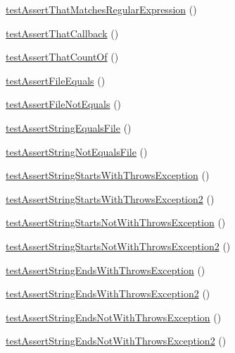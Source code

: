 \begin{DoxyCompactItemize}
\item 
\mbox{\hyperlink{class_framework___assert_test_a01bfe93225d3f6b19283003945d392cb}{test\+Assert\+That\+Matches\+Regular\+Expression}} ()
\item 
\mbox{\hyperlink{class_framework___assert_test_a59b8d4a483438cd5c0f2b934d640b530}{test\+Assert\+That\+Callback}} ()
\item 
\mbox{\hyperlink{class_framework___assert_test_a8d009baa93005665b92f4fd03152a23a}{test\+Assert\+That\+Count\+Of}} ()
\item 
\mbox{\hyperlink{class_framework___assert_test_a805b592ecc9a2a6d4a3c3e8d7f2b5363}{test\+Assert\+File\+Equals}} ()
\item 
\mbox{\hyperlink{class_framework___assert_test_a46c66ce31618ed83854ac6fd422e93b1}{test\+Assert\+File\+Not\+Equals}} ()
\item 
\mbox{\hyperlink{class_framework___assert_test_aef4e83a5c5185f7b393991313701fcdd}{test\+Assert\+String\+Equals\+File}} ()
\item 
\mbox{\hyperlink{class_framework___assert_test_aa0ed9a8d599f5fa816b91739e9042bd3}{test\+Assert\+String\+Not\+Equals\+File}} ()
\item 
\mbox{\hyperlink{class_framework___assert_test_a5d2c5c3fbfc70b632d0f9686faeac62c}{test\+Assert\+String\+Starts\+With\+Throws\+Exception}} ()
\item 
\mbox{\hyperlink{class_framework___assert_test_a9693c72d83f2fb329f25501671c39812}{test\+Assert\+String\+Starts\+With\+Throws\+Exception2}} ()
\item 
\mbox{\hyperlink{class_framework___assert_test_a5a42892c98fe0387684c679aa9388abd}{test\+Assert\+String\+Starts\+Not\+With\+Throws\+Exception}} ()
\item 
\mbox{\hyperlink{class_framework___assert_test_a2dbf2aad69f83d7d68fa586815d64f06}{test\+Assert\+String\+Starts\+Not\+With\+Throws\+Exception2}} ()
\item 
\mbox{\hyperlink{class_framework___assert_test_a169b3128b7d08892e289fc42e44cecd9}{test\+Assert\+String\+Ends\+With\+Throws\+Exception}} ()
\item 
\mbox{\hyperlink{class_framework___assert_test_a39a13da01d008da838ad3ca532c6f466}{test\+Assert\+String\+Ends\+With\+Throws\+Exception2}} ()
\item 
\mbox{\hyperlink{class_framework___assert_test_a271809478ed52e31df57a8596f05ebf8}{test\+Assert\+String\+Ends\+Not\+With\+Throws\+Exception}} ()
\item 
\mbox{\hyperlink{class_framework___assert_test_a2e59b786780e982ba3173cc2a8d68b0e}{test\+Assert\+String\+Ends\+Not\+With\+Throws\+Exception2}} ()

\end{DoxyCompactItemize}
